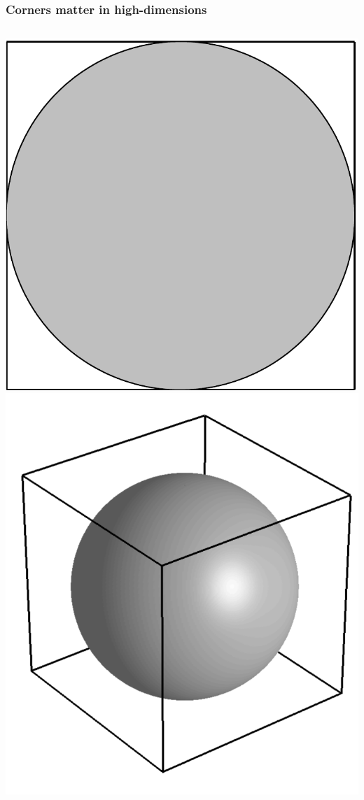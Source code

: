 \documentclass{beamer}
\begin{document}
\begin{frame}
\frametitle{Corners matter in high-dimensions}
\begin{columns}[c]
\includegraphics[width=\textwidth]{circle}
\includegraphics[width=\textwidth]{sphere}
\end{columns}
\end{frame}
\end{document}
